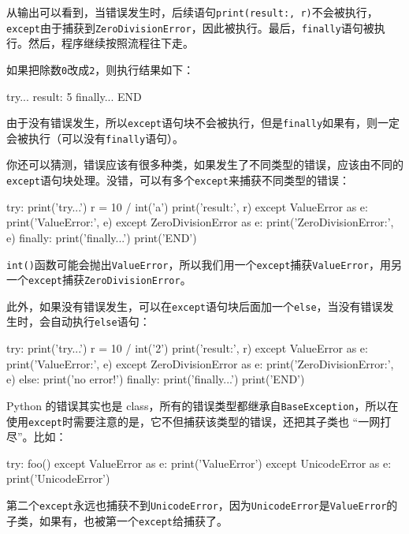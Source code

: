 从输出可以看到，当错误发生时，后续语句\texttt{print(\textquotesingle{}result:\textquotesingle{},\ r)}不会被执行，\texttt{except}由于捕获到\texttt{ZeroDivisionError}，因此被执行。最后，\texttt{finally}语句被执行。然后，程序继续按照流程往下走。

如果把除数\texttt{0}改成\texttt{2}，则执行结果如下：

\begin{pythoncode}
try...
result: 5
finally...
END
\end{pythoncode}

由于没有错误发生，所以\texttt{except}语句块不会被执行，但是\texttt{finally}如果有，则一定会被执行（可以没有\texttt{finally}语句）。

你还可以猜测，错误应该有很多种类，如果发生了不同类型的错误，应该由不同的\texttt{except}语句块处理。没错，可以有多个\texttt{except}来捕获不同类型的错误：

\begin{pythoncode}
try:
    print('try...')
    r = 10 / int('a')
    print('result:', r)
except ValueError as e:
    print('ValueError:', e)
except ZeroDivisionError as e:
    print('ZeroDivisionError:', e)
finally:
    print('finally...')
print('END')
\end{pythoncode}

\texttt{int()}函数可能会抛出\texttt{ValueError}，所以我们用一个\texttt{except}捕获\texttt{ValueError}，用另一个\texttt{except}捕获\texttt{ZeroDivisionError}。

此外，如果没有错误发生，可以在\texttt{except}语句块后面加一个\texttt{else}，当没有错误发生时，会自动执行\texttt{else}语句：

\begin{pythoncode}
try:
    print('try...')
    r = 10 / int('2')
    print('result:', r)
except ValueError as e:
    print('ValueError:', e)
except ZeroDivisionError as e:
    print('ZeroDivisionError:', e)
else:
    print('no error!')
finally:
    print('finally...')
print('END')
\end{pythoncode}

Python 的错误其实也是
class，所有的错误类型都继承自\texttt{BaseException}，所以在使用\texttt{except}时需要注意的是，它不但捕获该类型的错误，还把其子类也
``一网打尽''。比如：

\begin{pythoncode}
try:
    foo()
except ValueError as e:
    print('ValueError')
except UnicodeError as e:
    print('UnicodeError')
\end{pythoncode}

第二个\texttt{except}永远也捕获不到\texttt{UnicodeError}，因为\texttt{UnicodeError}是\texttt{ValueError}的子类，如果有，也被第一个\texttt{except}给捕获了。


